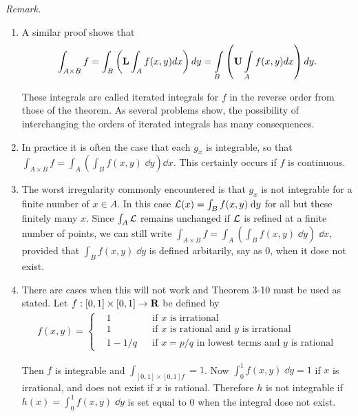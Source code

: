 \textit{Remark.} 
\begin{enumerate}[label={\upshape(\arabic*)}]
    \item A similar proof shows that
        \begin{align*}
            \int_{A\times B}f=\int_{B}\left(\mathbf{L}\int_{A}f(x,y)dx\right)dy=\intop_{B}\left(\mathbf{U}\intop_{A}f(x,y)dx\right)dy.
        \end{align*}

        These integrals are called iterated integrals for $f$ in the reverse
        order from those of the theorem. As several problems show,
        the possibility of interchanging the orders of iterated integrals
        has many consequences.
    \item In practice it is often the case that each $g_x$ is integrable, so that
        $\int_{A\times B} f = \int_A\left(\int_B f(x, y)\;\dd y\right)\dd x$. This certainly
        occurs if $f$ is continuous.
    \item The worst irregularity commonly encountered is that $g_x$
        is not integrable for a finite number of $x\in A$. In this case 
        $\mathcal{L}(x) =\int_B f(x, y) \;\mathrm{d} y$ for all but these finitely many $x$. Since 
        $\int_A \mathcal{{L}}$ remains unchanged if $\mathcal{L}$ is refined at a finite number of 
        points, we can still write $\int_{A\times B} f = \int_A \left(\int_B f(x, y)\;\dd y\right)\;\dd x$,
        provided that $\int_B f(x, y)\; \dd y$ is defined arbitarily, say as 0, when it dose not exist.
    \item There are cases when this will not work and Theorem 3-10
    must be used as stated. Let $f:[0,1]\times [0,1]\to\mathbf{R}$ be defined by 
    \begin{align*}
        f(x,y)
        = \left\{\begin{aligned}
            & 1 && \text{if $x$ is irrational} \\
            & 1 && \text{if $x$ is rational and $y$ is irrational} \\
            & 1-1/q && \text{if $x=p/q$ in lowest terms and $y$ is rational}
        \end{aligned}\right.
    \end{align*}
    
    Then $f$  is integrable and $\int_{[0,1]\times [0,1] f} = 1$. Now $\int_0^1f(x, y)\;\dd y=1$ if 
    $x$ is irrational, and does not exist if $x$ is rational. Therefore $h$ is not integrable 
    if $h(x) = \int_0^1 f(x, y)\;\dd y$ is set equal to 0 when the integral dose not exist. 


\end{enumerate}
